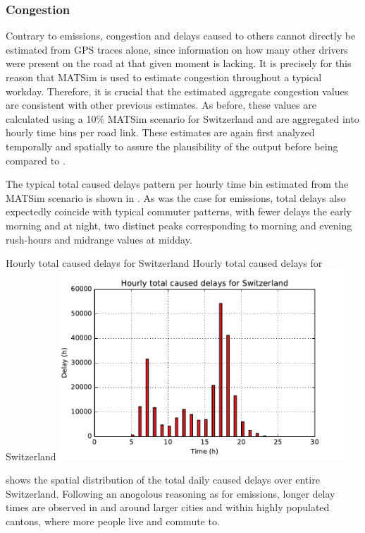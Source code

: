 \subsubsection{Congestion}

Contrary to emissions, congestion and delays caused to others cannot directly be estimated from GPS traces alone, since information on how many other drivers were present on the road at that given moment is lacking.
It is precisely for this reason that MATSim is used to estimate congestion throughout a typical workday.
Therefore, it is crucial that the estimated aggregate congestion values are consistent with other previous estimates.
As before, these values are calculated using a 10\% MATSim scenario for Switzerland and are aggregated into hourly time bins per road link.
These estimates are again first analyzed temporally and spatially to assure the plausibility of the output before being compared to \cite{mkinfras2016staukosten}.

The typical total caused delays pattern per hourly time bin estimated from the MATSim scenario is shown in .
As was the case for emissions, total delays also expectedly coincide with typical commuter patterns, with fewer delays the early morning and at night, two distinct peaks corresponding to morning and evening rush-hours and midrange values at midday.

\createfigure%
{Hourly total caused delays for Switzerland}%
{Hourly total caused delays for Switzerland}%
{\label{fig:hourlyDelays}}%
{\includegraphics[width=0.8\textwidth,
angle=0]{figures/hourly_caused_delays.pdf}}%
{}

 shows the spatial distribution of the total daily caused delays over entire Switzerland.
Following an anogolous reasoning as for emissions, longer delay times are observed in and around larger cities and within highly populated cantons, where more people live and commute to.

